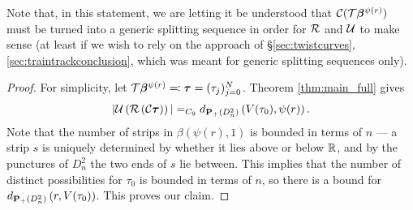 Note that, in this statement, we are letting it be understood that ${\mathcal C}({\mathcal T}\bm\beta^{\psi(r)})$ must be turned into a generic splitting sequence in order for ${\mathcal R}$ and ${\mathcal U}$ to make sense (at least if we wish to rely on the approach of \S \ref{sec:twistcurves}, \ref{sec:traintrackconclusion}, which was meant for generic splitting sequences only).

\begin{proof}
For simplicity, let ${\mathcal T}\bm\beta^{\psi(r)}\eqqcolon \bm\tau =(\tau_j)_{j=0}^N$. Theorem \ref{thm:main_full} gives
$$|{\mathcal U}\left({\mathcal R}\left({\mathcal C}\bm\tau\right)\right)|=_{C_9} d_{{\mathbf{P}_+}(D^2_n)}\left(V(\tau_0),\psi(r)\right).$$
Note that the number of strips in $\beta\left(\psi(r),1\right)$ is bounded in terms of $n$ --- a strip $s$ is uniquely determined by whether it lies above or below $\mathbb R$, and by the punctures of $D^2_n$ the two ends of $s$ lie between. This implies that the number of distinct possibilities for $\tau_0$ is bounded in terms of $n$, so there is a bound for $d_{{\mathbf{P}_+}(D^2_n)}\left(r,V(\tau_0)\right)$. This proves our claim.
\end{proof}

